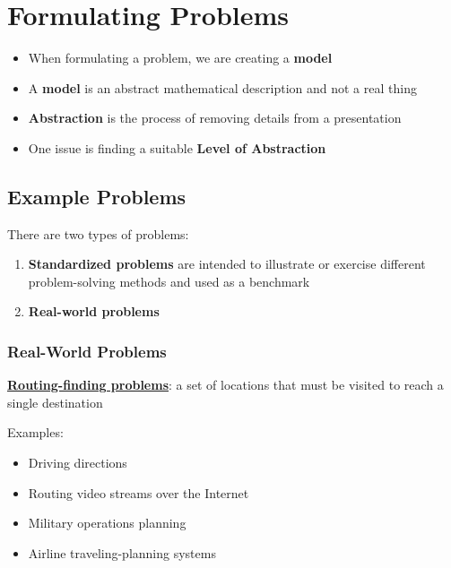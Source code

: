 \documentclass[12pt]{article}
\newcommand{\definition}[1]{\underline{\textbf{#1}}}
\begin{document}
\section{Formulating Problems}

\begin{itemize}
    \item When formulating a problem, we are creating a \textbf{model}
    \item A \textbf{model} is an abstract mathematical description and not a real thing
    \item \textbf{Abstraction} is the process of removing details from a presentation
    \item One issue is finding a suitable \textbf{Level of Abstraction}
\end{itemize}

\subsection{Example Problems}

There are two types of problems:
\begin{enumerate}
    \item \textbf{Standardized problems} are intended to illustrate or exercise different problem-solving methods and used as a benchmark
    \item \textbf{Real-world problems}
\end{enumerate}

\subsubsection{Real-World Problems}

\definition{Routing-finding problems}: a set of locations that must be visited to reach a single destination

Examples:
\begin{itemize}
    \item Driving directions
    \item Routing video streams over the Internet
    \item Military operations planning
    \item Airline traveling-planning systems
\end{itemize}
\end{document}
